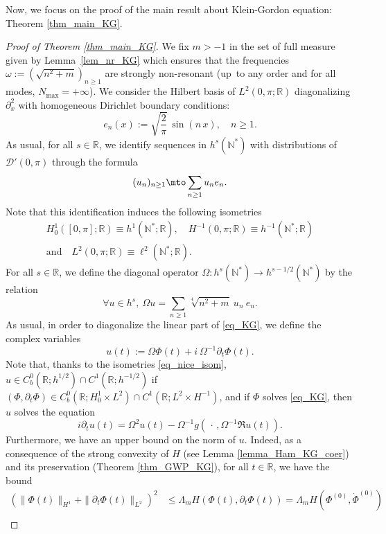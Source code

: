Now, we focus on the proof of the main result about Klein-Gordon equation: Theorem \ref{thm_main_KG}.
\begin{proof}[Proof of Theorem \ref{thm_main_KG}] We fix $m>-1$ in the set of full measure given by Lemma~\ref{lem_nr_KG} which ensures that the frequencies $\omega:=(\sqrt{n^2+m})_{n\geq 1}$ are strongly non-resonant (up~to any order and for all modes, \ie $N_{\max}=+\infty$). We consider the Hilbert basis of $L^2(0,\pi;\mathbb{R})$ diagonalizing $\partial_x^2$ with homogeneous Dirichlet boundary conditions:
\[
e_n(x):= \sqrt{\frac2\pi}\, \sin(n \, x), \quad n\geq 1.
\]
As usual, for all $s\in \mathbb{R}$, we identify sequences in $h^{s}(\mathbb{N}^*)$ with distributions of $\mathcal{D}'(0,\pi)$ through the formula
\[
(u_n)_{n\geq 1} \mto \sum_{n\geq 1} u_n e_n.
\]
Note that this identification induces the following isometries
\begin{multline}
\label{eq_nice_isom}
H^1_0([0,\pi];\mathbb{R}) \equiv h^1(\mathbb{N}^*;\mathbb{R}), \quad H^{-1}(0,\pi;\mathbb{R}) \equiv h^{-1}(\mathbb{N}^*;\mathbb{R})\\ \text{and} \quad L^{2}(0,\pi;\mathbb{R}) \equiv \ell^2(\mathbb{N}^*;\mathbb{R}).
\end{multline}
For all $s\in \mathbb{R}$, we define the diagonal operator $\Omega:h^s(\mathbb{N}^*) \to h^{s-1/2}(\mathbb{N}^*)$ by the relation
\[
\forall u\in h^s, \ \Omega u = \sum_{n\geq 1} \sqrt[4]{n^2+m} \ u_n \ e_n.
\]
As usual, in order to diagonalize the linear part of \eqref{eq_KG}, we define the complex variables
\[
u(t):= \Omega \Phi(t)+i \ \Omega^{-1} \partial_t \Phi(t).
\]
Note that, thanks to the isometries \eqref{eq_nice_isom}, $u \in C^0_b(\mathbb{R}; h^{1/2}) \cap C^1(\mathbb{R}; h^{-1/2})$ if $(\Phi,\partial_t \Phi) \in C^0_b(\mathbb{R}; H^1_0 \times L^2) \cap C^1(\mathbb{R}; L^2 \times H^{-1})$, and if $\Phi$ solves \eqref{eq_KG}, then $u$ solves the equation%
\begin{equation}
\label{eq_ca_commence_a_ressembler_a_qqch}
i\partial_t u(t) = \Omega^2 u(t) - \Omega^{-1} g(\, \cdot\,,\Omega^{-1} \Re u(t)).
\end{equation}
Furthermore, we have an upper bound on the norm of $u$. Indeed, as a consequence of the strong convexity of $H$ (see Lemma \ref{lemma_Ham_KG_coer}) and its preservation (Theorem \ref{thm_GWP_KG}), for all $t\in \mathbb{R}$, we have the bound
\begin{equation*}
\begin{split}
(\| \Phi(t) \|_{H^1} + \| \partial_t \Phi(t) \|_{L^2})^2 & \leq \Lambda_m H(\Phi(t),\partial_t \Phi(t)) = \Lambda_m H(\Phi^{(0)},\dot{\Phi}^{(0)}) \\

\end{split}
\end{equation*}
\end{proof}
